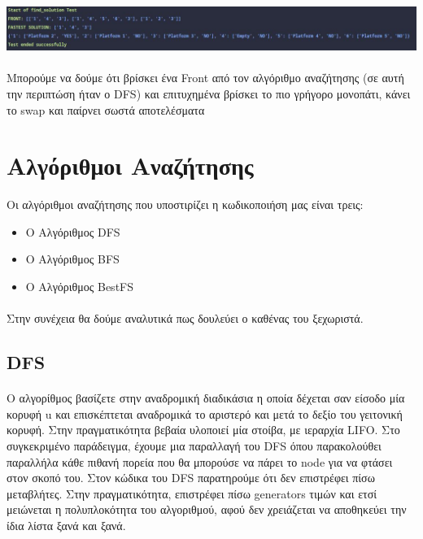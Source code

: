\documentclass{article}
\begin{document}
    \includegraphics[scale=0.5]{images/find_solution.jpeg}
    \paragraph{}
    Μπορούμε να δούμε ότι βρίσκει ένα Front από τον αλγόριθμο αναζήτησης (σε αυτή την περιπτώση ήταν ο DFS) και επιτυχημένα βρίσκει το πιο γρήγορο μονοπάτι, κάνει το swap
    και παίρνει σωστά αποτελέσματα

    \newpage
    \section{Αλγόριθμοι Αναζήτησης}
    Οι αλγόριθμοι αναζήτησης που υποστιρίζει η κωδικοποιήση μας είναι τρεις:
    
    \begin{itemize}
        \item Ο Αλγόριθμος DFS
        \item Ο Αλγόριθμος BFS
        \item Ο Αλγόριθμος BestFS
    \end{itemize}

    \paragraph{}
    Στην συνέχεια θα δούμε αναλυτικά πως δουλεύει ο καθένας του ξεχωριστά.

    \subsection{DFS}
    

    \paragraph{}
    O αλγορίθμος βασίζετε στην αναδρομική διαδικάσια η οποία δέχεται σαν είσοδο μία κορυφή u και επισκέπτεται αναδρομικά το αριστερό και μετά το δεξίο του γειτονική κορυφή. 
    Στην πραγματικότητα βεβαία υλοποιεί μία στοίβα, με ιεραρχία LIFO. Στο συγκεκριμένο παράδειγμα, έχουμε μια παραλλαγή του DFS όπου παρακολούθει παραλλήλα κάθε πιθανή πορεία
    που θα μπορούσε να πάρει το node για να φτάσει στον σκοπό του. Στον κώδικα του DFS παρατηρούμε ότι δεν επιστρέφει πίσω μεταβλήτες. Στην πραγματικότητα, επιστρέφει 
    πίσω generators τιμών και ετσί μειώνεται η πολυπλοκότητα του αλγοριθμού, αφού δεν χρειάζεται να αποθηκεύει την ίδια λίστα ξανά και ξανά. 
\end{document}
